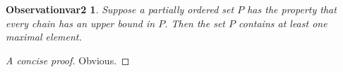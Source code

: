 \newtheorem{observationvar2}[observation]{Observationvar2}
\begin{observationvar2}
	Suppose a partially ordered set $P$ has the property
	that every chain has an upper bound in $P$. Then the
	set $P$ contains at least one maximal element.
\end{observationvar2}
\begin{proof}[A concise proof]
	Obvious.
\end{proof}